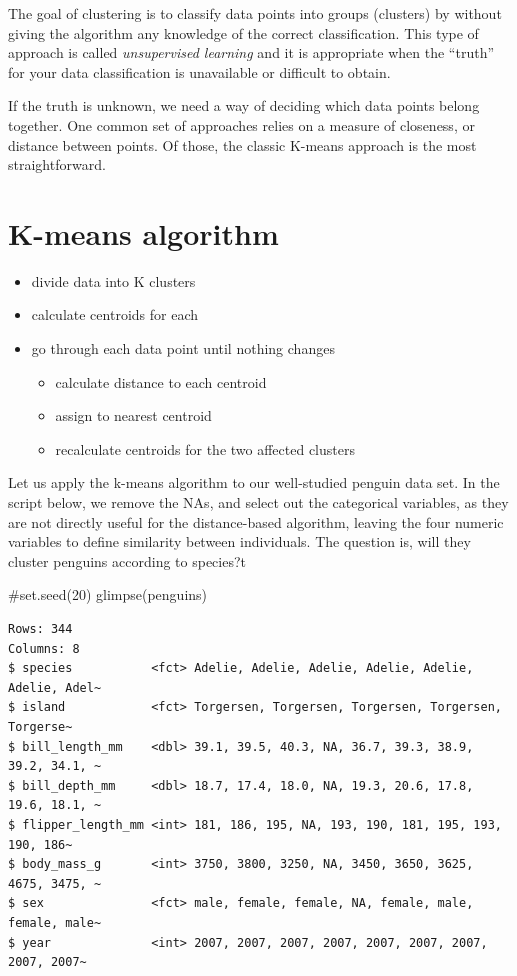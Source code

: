 \documentclass[
  letterpaper,
  DIV=11,
  numbers=noendperiod]{scrreprt}
\newenvironment{Shaded}{\begin{snugshade}}{\end{snugshade}}
\newcommand{\CommentTok}[1]{\textcolor[rgb]{0.37,0.37,0.37}{#1}}
\newcommand{\FunctionTok}[1]{\textcolor[rgb]{0.28,0.35,0.67}{#1}}
\newcommand{\NormalTok}[1]{\textcolor[rgb]{0.00,0.23,0.31}{#1}}
\providecommand{\tightlist}{%
  \setlength{\itemsep}{0pt}\setlength{\parskip}{0pt}}\usepackage{longtable,booktabs,array}
\begin{document}
The goal of clustering is to classify data points into groups (clusters)
by without giving the algorithm any knowledge of the correct
classification. This type of approach is called \emph{unsupervised
learning} and it is appropriate when the ``truth'' for your data
classification is unavailable or difficult to obtain.

If the truth is unknown, we need a way of deciding which data points
belong together. One common set of approaches relies on a measure of
closeness, or distance between points. Of those, the classic K-means
approach is the most straightforward.

\hypertarget{k-means-algorithm}{%
\section{K-means algorithm}\label{k-means-algorithm}}

\begin{itemize}
\tightlist
\item
  divide data into K clusters
\item
  calculate centroids for each
\item
  go through each data point until nothing changes

  \begin{itemize}
  \tightlist
  \item
    calculate distance to each centroid
  \item
    assign to nearest centroid
  \item
    recalculate centroids for the two affected clusters
  \end{itemize}
\end{itemize}

Let us apply the k-means algorithm to our well-studied penguin data set.
In the script below, we remove the NAs, and select out the categorical
variables, as they are not directly useful for the distance-based
algorithm, leaving the four numeric variables to define similarity
between individuals. The question is, will they cluster penguins
according to species?t

\begin{Shaded}
\begin{Highlighting}[]
\CommentTok{\#set.seed(20)}
\FunctionTok{glimpse}\NormalTok{(penguins)}
\end{Highlighting}
\end{Shaded}

\begin{verbatim}
Rows: 344
Columns: 8
$ species           <fct> Adelie, Adelie, Adelie, Adelie, Adelie, Adelie, Adel~
$ island            <fct> Torgersen, Torgersen, Torgersen, Torgersen, Torgerse~
$ bill_length_mm    <dbl> 39.1, 39.5, 40.3, NA, 36.7, 39.3, 38.9, 39.2, 34.1, ~
$ bill_depth_mm     <dbl> 18.7, 17.4, 18.0, NA, 19.3, 20.6, 17.8, 19.6, 18.1, ~
$ flipper_length_mm <int> 181, 186, 195, NA, 193, 190, 181, 195, 193, 190, 186~
$ body_mass_g       <int> 3750, 3800, 3250, NA, 3450, 3650, 3625, 4675, 3475, ~
$ sex               <fct> male, female, female, NA, female, male, female, male~
$ year              <int> 2007, 2007, 2007, 2007, 2007, 2007, 2007, 2007, 2007~
\end{verbatim}
\end{document}
